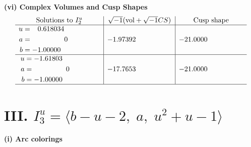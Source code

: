 \documentclass[1p]{elsarticle_modified}
\theoremstyle{definition}
\newcommand{\I}{\sqrt{-1}}
\begin{document}
\newpage\flushleft \textbf{(vi) Complex Volumes and Cusp Shapes}
$$\begin{array}{c|c|c}  
\text{Solutions to }I^u_{2}& \I (\text{vol} + \sqrt{-1}CS) & \text{Cusp shape}\\
 \hline 
\begin{aligned}
u &= \phantom{-}0.618034\phantom{ +0.000000I} \\
a &= \phantom{-0.000000 } 0 \\
b &= -1.00000\phantom{ +0.000000I}\end{aligned}
 & -1.97392\phantom{ +0.000000I} & -21.0000\phantom{ +0.000000I} \\ \hline\begin{aligned}
u &= -1.61803\phantom{ +0.000000I} \\
a &= \phantom{-0.000000 } 0 \\
b &= -1.00000\phantom{ +0.000000I}\end{aligned}
 & -17.7653\phantom{ +0.000000I} & -21.0000\phantom{ +0.000000I}\\
 \hline 
 \end{array}$$\newpage\newpage\renewcommand{\arraystretch}{1}
\centering \section*{III. $I^u_{3}= \langle b- u-2,\;a,\;u^2+u-1 \rangle$}
\flushleft \textbf{(i) Arc colorings}\\
\end{document}
